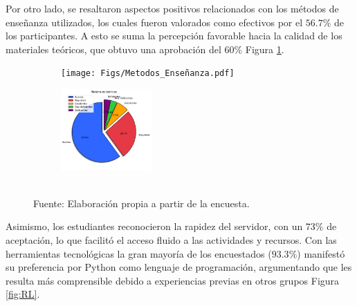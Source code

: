 \documentclass[letter,oneside,12pt,spanish]{report}
\begin{document}
Por otro lado, se resaltaron aspectos positivos relacionados con los métodos de enseñanza utilizados, los cuales fueron valorados como efectivos por el $56.7\%$ de los participantes. A esto se suma la percepción favorable hacia la calidad de los materiales teóricos, que obtuvo una aprobación del $60\%$ Figura \ref{fig:MM}. 

\begin{figure}[h]
	\centering
    \begin{subfigure}
        \centering
        \texttt{[image: Figs/Metodos\_Enseñanza.pdf]}
    \end{subfigure}
	\hfill
    \begin{subfigure}
        \centering
        \includegraphics[width=0.38\textwidth]{Figs/materiales_teoricos.pdf}
    \end{subfigure}
	\label{fig:MM}
	\\ Fuente: Elaboración propia a partir de la encuesta.
\end{figure}


Asimismo, los estudiantes reconocieron la rapidez del servidor, con un $73\%$ de aceptación, lo que facilitó el acceso fluido a las actividades y recursos.
Con las herramientas tecnológicas la gran mayoría de los encuestados ($93.3\%$) manifestó su preferencia por Python como lenguaje de programación, argumentando que les resulta más comprensible debido a experiencias previas en otros grupos Figura \ref{fig:RL}. 
\end{document}
